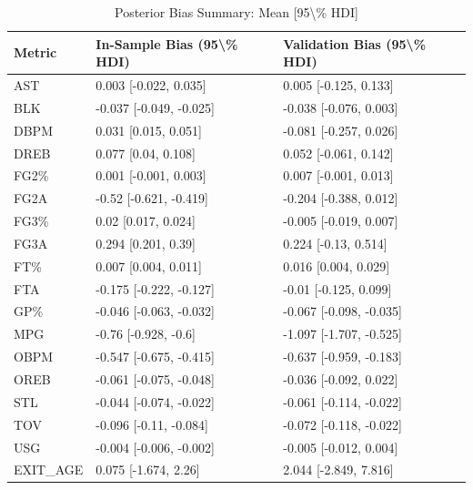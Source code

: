 \begin{table}[t]
\caption*{
{\fontsize{20}{25}\selectfont  Posterior Bias Summary: Mean [95\textbackslash{}\% HDI]\fontsize{12}{15}\selectfont }
} 
\fontsize{12.0pt}{14.0pt}\selectfont
\begin{tabular*}{\linewidth}{@{\extracolsep{\fill}}lll}
\toprule
Metric & In-Sample Bias (95\textbackslash{}\% HDI) & Validation Bias (95\textbackslash{}\% HDI) \\ 
\midrule\addlinespace[2.5pt]
AST & 0.003 [-0.022, 0.035] & 0.005 [-0.125, 0.133] \\ 
BLK & -0.037 [-0.049, -0.025] & -0.038 [-0.076, 0.003] \\ 
DBPM & 0.031 [0.015, 0.051] & -0.081 [-0.257, 0.026] \\ 
DREB & 0.077 [0.04, 0.108] & 0.052 [-0.061, 0.142] \\ 
FG2\% & 0.001 [-0.001, 0.003] & 0.007 [-0.001, 0.013] \\ 
FG2A & -0.52 [-0.621, -0.419] & -0.204 [-0.388, 0.012] \\ 
FG3\% & 0.02 [0.017, 0.024] & -0.005 [-0.019, 0.007] \\ 
FG3A & 0.294 [0.201, 0.39] & 0.224 [-0.13, 0.514] \\ 
FT\% & 0.007 [0.004, 0.011] & 0.016 [0.004, 0.029] \\ 
FTA & -0.175 [-0.222, -0.127] & -0.01 [-0.125, 0.099] \\ 
GP\% & -0.046 [-0.063, -0.032] & -0.067 [-0.098, -0.035] \\ 
MPG & -0.76 [-0.928, -0.6] & -1.097 [-1.707, -0.525] \\ 
OBPM & -0.547 [-0.675, -0.415] & -0.637 [-0.959, -0.183] \\ 
OREB & -0.061 [-0.075, -0.048] & -0.036 [-0.092, 0.022] \\ 
STL & -0.044 [-0.074, -0.022] & -0.061 [-0.114, -0.022] \\ 
TOV & -0.096 [-0.11, -0.084] & -0.072 [-0.118, -0.022] \\ 
USG & -0.004 [-0.006, -0.002] & -0.005 [-0.012, 0.004] \\ 
EXIT\_AGE & 0.075 [-1.674, 2.26] & 2.044 [-2.849, 7.816] \\ 
\bottomrule
\end{tabular*}
\end{table}


